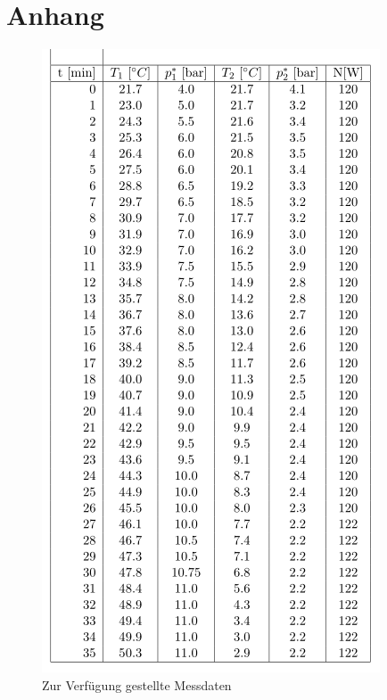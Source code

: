 \appendix
\section{Anhang}
\begin{figure}[H]
	\centering
    \includegraphics{content/messdaten.PNG}
    \caption{Zur Verfügung gestellte Messdaten}
	\label{fig:messdaten}
\end{figure}
